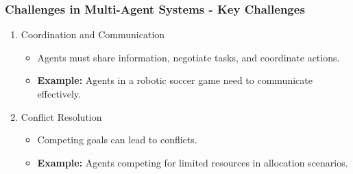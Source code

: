 \documentclass[aspectratio=169]{beamer}
\begin{document}
\begin{frame}[fragile]
    \frametitle{Challenges in Multi-Agent Systems - Key Challenges}
    \begin{enumerate}
        \item Coordination and Communication
            \begin{itemize}
                \item Agents must share information, negotiate tasks, and coordinate actions.
                \item \textbf{Example:} Agents in a robotic soccer game need to communicate effectively.
            \end{itemize}
        \item Conflict Resolution
            \begin{itemize}
                \item Competing goals can lead to conflicts.
                \item \textbf{Example:} Agents competing for limited resources in allocation scenarios.
            \end{itemize}
    \end{enumerate}
\end{frame}
\end{document}
